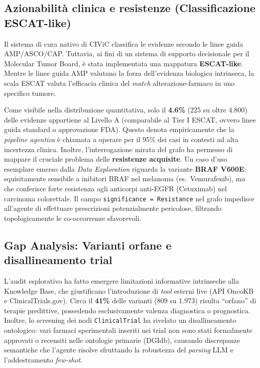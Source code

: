 \documentclass[11pt,a4paper]{article}
\newcommand{\code}[1]{\texttt{\small #1}}
\begin{document}
\subsection{Azionabilit\`a clinica e resistenze (Classificazione ESCAT-like)}
Il sistema di cura nativo di CIViC classifica le evidenze secondo le linee guida AMP/ASCO/CAP. Tuttavia, ai fini di un sistema di supporto decisionale per il Molecular Tumor Board, \`e stata implementata una mappatura \textbf{ESCAT-like}. Mentre le linee guida AMP valutano la forza dell'evidenza biologica intrinseca, la scala ESCAT valuta l'efficacia clinica del \emph{match} alterazione-farmaco in uno specifico tumore.

Come visibile nella distribuzione quantitativa, solo il \textbf{4.6\%} (225 su oltre 4.800) delle evidenze appartiene al Livello A (comparabile al Tier I ESCAT, ovvero linee guida standard o approvazione FDA). Questo denota empiricamente che la \emph{pipeline agentica} \`e chiamata a operare per il 95\% dei casi in contesti ad alta incertezza clinica.
Inoltre, l'interrogazione mirata del grafo ha permesso di mappare il cruciale problema delle \textbf{resistenze acquisite}. Un caso d'uso esemplare emerso dalla \emph{Data Exploration} riguarda la variante \textbf{BRAF V600E}: squisitamente sensibile a inibitori BRAF nel melanoma (es.\ Vemurafenib), ma che conferisce forte resistenza agli anticorpi anti-EGFR (Cetuximab) nel carcinoma colorettale. Il campo \code{significance = Resistance} nel grafo impedisce all'agente di effettuare prescrizioni potenzialmente pericolose, filtrando topologicamente le co-occorrenze sfavorevoli.

\subsection{Gap Analysis: Varianti orfane e disallineamento trial}
L'audit esplorativo ha fatto emergere limitazioni informative intrinseche alla Knowledge Base, che giustificano l'introduzione di \emph{tool} esterni live (API OncoKB e ClinicalTrials.gov).
Circa il \textbf{41\%} delle varianti (809 su 1.973) risulta ``orfano'' di terapie predittive, possedendo esclusivamente valenza diagnostica o prognostica. Inoltre, lo screening dei nodi \code{ClinicalTrial} ha rivelato un disallineamento ontologico: vari farmaci sperimentali inseriti nei trial non sono stati formalmente approvati o recensiti nelle ontologie primarie (DGIdb), causando discrepanze semantiche che l'agente risolve sfruttando la robustezza del \emph{parsing} LLM e l'addestramento \emph{few-shot}.
\end{document}
